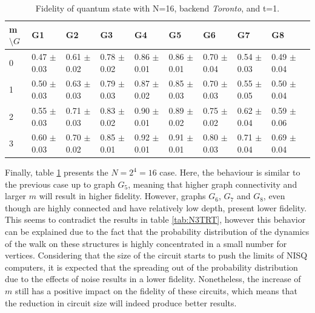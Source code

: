 \documentclass[../../dissertation.tex]{subfiles}
\begin{document}
\begin{table}[!h]
\centering
\begin{tabular}{|l|l|l|l|l|l|l|l|l|l|}
\hline
m$\setminus G$ & G1               & G2    & G3    & G4 & G5    & G6    & G7    & G8   \\ \hline
0   &   0.47 $\pm$ 0.03   &   0.61 $\pm$ 0.02     &   0.78 $\pm$ 0.02       & 0.86 $\pm$ 0.01 &   0.86 $\pm$ 0.01 &   0.70 $\pm$ 0.04   &   0.54 $\pm$ 0.03 &   0.49 $\pm$ 0.04  \\ \hline
1   & 0.50 $\pm$ 0.03     & 0.63 $\pm$ 0.03        & 0.79 $\pm$ 0.03        & 0.87 $\pm$ 0.02 & 0.85 $\pm$ 0.03 & 0.70 $\pm$ 0.03 & 0.55 $\pm$ 0.05 & 0.50 $\pm$ 0.04  \\ \hline
2   & 0.55 $\pm$ 0.03     & 0.71 $\pm$ 0.03     & 0.83 $\pm$ 0.02     & 0.90 $\pm$ 0.01 & 0.89 $\pm$ 0.02 & 0.75 $\pm$ 0.02 & 0.62 $\pm$ 0.04 & 0.59 $\pm$ 0.06  \\ \hline
3   & 0.60 $\pm$ 0.03     & 0.70 $\pm$ 0.02     & 0.85 $\pm$ 0.01     & 0.92 $\pm$ 0.01 & 0.91 $\pm$ 0.01 & 0.80 $\pm$ 0.03 & 0.71 $\pm$ 0.04 & 0.69 $\pm$ 0.04   \\\hline
\end{tabular}
\caption{Fidelity of quantum state with N=16, backend \textit{Toronto}, and t=1.}
\label{tab:N4TRT}
\end{table}
Finally,  table \ref{tab:N4TRT} presents the $N = 2^4 = 16$ case. Here, the behaviour is similar to the previous case up to graph $G_5$, meaning that higher graph connectivity and larger $m$ will result in higher fidelity. However, graphs $G_6$, $G_7$ and $G_8$, even though are highly connected and have relatively low depth, present lower fidelity. This seems to contradict the results in table \ref{tab:N3TRT}, however this behavior can be explained due to the fact that the probability distribution of the dynamics of the walk on these structures is highly concentrated in a small number for vertices. Considering that the size of the circuit starts to push the limits of NISQ computers, it is expected that the spreading out of the probability distribution due to the effects of noise results in a lower fidelity. Nonetheless, the increase of $m$ still has a positive impact on the fidelity of these circuits, which means that the reduction in circuit size will indeed produce better results.
\end{document}
